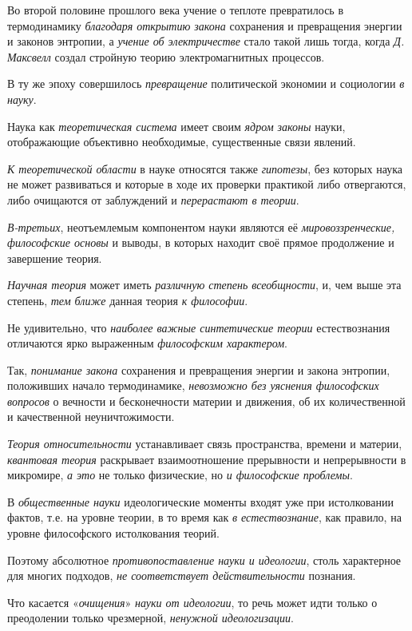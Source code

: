 \documentclass[a4paper,14pt,russian]{extreport}
\begin{document}
Во второй половине прошлого века учение о теплоте превратилось в термодинамику \emph{благодаря открытию закона} сохранения и превращения энергии и законов энтропии, а \emph{учение об электричестве} стало такой лишь тогда, когда \emph{Д. Максвелл} создал стройную теорию электромагнитных процессов.

В ту же эпоху совершилось \emph{превращение} политической экономии и социологии \emph{в науку}.

Наука как \emph{теоретическая система} имеет своим \emph{ядром законы} науки, отображающие объективно необходимые, существенные связи явлений.

\emph{К теоретической области} в науке относятся также \emph{гипотезы}, без которых наука не может развиваться и которые в ходе их проверки практикой либо отвергаются, либо очищаются от заблуждений и \emph{перерастают в теории}.

\emph{В-третьих}, неотъемлемым компонентом науки являются её \emph{мировоззренческие, философские основы} и выводы, в которых находит своё прямое продолжение и завершение теория.

\emph{Научная теория} может иметь \emph{различную степень всеобщности}, и, чем выше эта степень, \emph{тем ближе} данная теория \emph{к философии}.

Не удивительно, что \emph{наиболее важные синтетические теории} естествознания отличаются ярко выраженным \emph{философским характером}.

Так, \emph{понимание закона} сохранения и превращения энергии и закона энтропии, положивших начало термодинамике, \emph{невозможно без уяснения философских вопросов} о вечности и бесконечности материи и движения, об их количественной и качественной неуничтожимости.

\emph{Теория относительности} устанавливает связь пространства, времени и материи, \emph{квантовая теория} раскрывает взаимоотношение прерывности и непрерывности в микромире, \emph{а это} не только физические, но \emph{и философские проблемы}.

В \emph{общественные науки} идеологические моменты входят уже при истолковании фактов, т.е. на уровне теории, в то время как \emph{в естествознание}, как правило, на уровне философского истолкования теорий.

Поэтому абсолютное \emph{противопоставление науки и идеологии}, столь характерное для многих подходов, \emph{не соответствует действительности} познания.

Что касается «\emph{очищения}» \emph{науки от идеологии}, то речь может идти только о преодолении только чрезмерной, \emph{ненужной идеологизации}.
\end{document}
